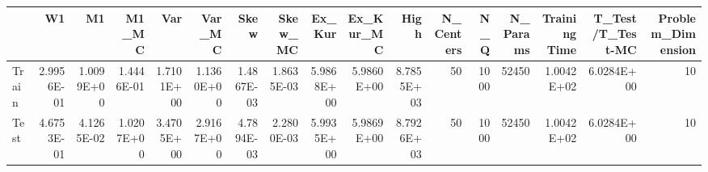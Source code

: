 \begin{tabular}{lrrrrrrrrrrrrrrrr}
\toprule
{} &         W1 &         M1 &      M1\_MC &        Var &     Var\_MC &       Skew &    Skew\_MC &     Ex\_Kur &  Ex\_Kur\_MC &       High &  N\_Centers &   N\_Q &  N\_Params &  Training Time &  T\_Test/T\_Test-MC &  Problem\_Dimension \\
\midrule
Train & 2.9956E-01 & 1.0099E+00 & 1.4446E-01 & 1.7101E+00 & 1.1360E+00 & 1.4867E-03 & 1.8635E-03 & 5.9868E+00 & 5.9860E+00 & 8.7855E+03 &         50 &  1000 &     52450 &     1.0042E+02 &        6.0284E+00 &                 10 \\
Test  & 4.6753E-01 & 4.1265E-02 & 1.0207E+00 & 3.4705E+00 & 2.9167E+00 & 4.7894E-03 & 2.2800E-03 & 5.9935E+00 & 5.9869E+00 & 8.7926E+03 &         50 &  1000 &     52450 &     1.0042E+02 &        6.0284E+00 &                 10 \\
\bottomrule
\end{tabular}
